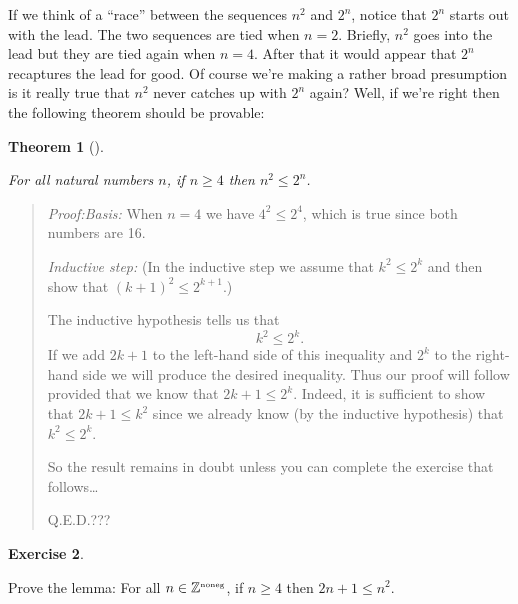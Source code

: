 \documentclass[10pt,]{book}
\theoremstyle{plain}
\newtheorem{theorem}{Theorem}[section]
\theoremstyle{definition}
\theoremstyle{definition}
\newtheorem{exercise}[theorem]{Exercise}
\numberwithin{equation}{section}
\renewcommand{\Naturals}{{\mathbb Z}^{\mbox{\tiny noneg}} }
\newcommand{\Naturals}{{\mathbb N}}
\begin{document}
    If we think of a ``race'' between the sequences \(n^2\) and \(2^n\), notice
    that \(2^n\) starts out with the lead. The two sequences are tied when
    \(n=2\). Briefly, \(n^2\) goes into the lead but they are tied again when
    \(n=4\). After that it would appear that \(2^n\) recaptures the lead for good.
    Of course we're making a rather broad presumption \textemdash{} is it really true
    that \(n^2\) never catches up with \(2^n\) again? Well, if we're right
    then the following theorem should be provable:
\begin{theorem}[{}]\label{theorem-25}

        For all natural numbers \(n\), if \(n \geq 4\) then \(n^2 \leq 2^n\).
\end{theorem}
\begin{quote}\emph{Proof:}\emph{Basis:} When \(n=4\) we have \(4^2 \leq 2^4\), which is 
  true since both numbers are 16.

   \emph{Inductive step:} (In the inductive step we assume
  that \(k^2 \leq 2^k\) and then show that \((k+1)^2 \leq 2^{k+1}\).)

  The inductive hypothesis tells us that
  \begin{equation*}
    k^2 \leq 2^k.
  \end{equation*}
  If we add \(2k+1\) to the left-hand side of this inequality
  and \(2^k\) to the right-hand side we will produce the desired
  inequality.  Thus our proof will follow provided that
  we know that \(2k+1 \leq 2^k\).  Indeed, it is sufficient to show
  that \(2k+1 \leq k^2\) since we already know (by the inductive
  hypothesis) that \(k^2 \leq 2^k\).

  So the result remains in doubt unless you can complete the 
  exercise that follows\ldots

      Q.E.D.???
  \end{quote}
\begin{exercise}\label{exercise-46}

        Prove the lemma: For all \(n \in \Naturals\), if \(n \geq 4\) then
        \(2n+1 \leq n^2\).
\end{exercise}
\typeout{************************************************}
\typeout{************************************************}
\end{document}

